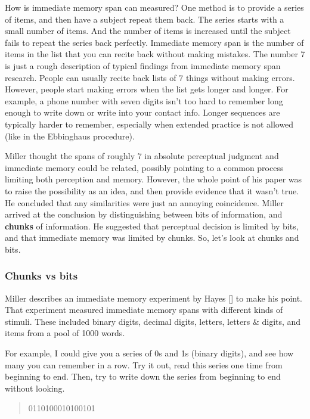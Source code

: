 \documentclass[
  oneside,
  12pt]{crumpbook}
\begin{document}
How is immediate memory span can measured? One method is to provide a series of items, and then have a subject repeat them back. The series starts with a small number of items. And the number of items is increased until the subject fails to repeat the series back perfectly. Immediate memory span is the number of items in the list that you can recite back without making mistakes. The number 7 is just a rough description of typical findings from immediate memory span research. People can usually recite back lists of 7 things without making errors. However, people start making errors when the list gets longer and longer. For example, a phone number with seven digits isn't too hard to remember long enough to write down or write into your contact info. Longer sequences are typically harder to remember, especially when extended practice is not allowed (like in the Ebbinghaus procedure).

Miller thought the spans of roughly 7 in absolute perceptual judgment and immediate memory could be related, possibly pointing to a common process limiting both perception and memory. However, the whole point of his paper was to raise the possibility as an idea, and then provide evidence that it wasn't true. He concluded that any similarities were just an annoying coincidence. Miller arrived at the conclusion by distinguishing between bits of information, and \textbf{chunks} of information. He suggested that perceptual decision is limited by bits, and that immediate memory was limited by chunks. So, let's look at chunks and bits.

\hypertarget{chunks-vs-bits}{%
\subsubsection{Chunks vs bits}\label{chunks-vs-bits}}

Miller describes an immediate memory experiment by Hayes {[}{]} to make his point. That experiment measured immediate memory spans with different kinds of stimuli. These included binary digits, decimal digits, letters, letters \& digits, and items from a pool of 1000 words.

For example, I could give you a series of 0s and 1s (binary digits), and see how many you can remember in a row. Try it out, read this series one time from beginning to end. Then, try to write down the series from beginning to end without looking.

\begin{quote}
0110100010100101
\end{quote}
\end{document}
